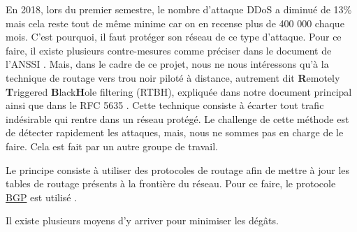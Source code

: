 En 2018, lors du premier semestre, le nombre d'attaque DDoS a diminué de 13\% mais cela reste tout de même minime car on en recense plus de 400 000 chaque mois. C'est pourquoi, il faut protéger son réseau de ce type d'attaque. Pour ce faire, il existe plusieurs contre-mesures comme préciser dans le document de l'ANSSI \cite{Ans15}. Mais, dans le cadre de ce projet, nous ne nous intéressons qu'à la technique de routage vers trou noir piloté à distance, autrement dit \textbf{R}emotely \textbf{T}riggered \textbf{B}lack\textbf{H}ole filtering (RTBH), expliquée dans notre document principal \cite{Sys05} ainsi que dans le RFC 5635 \cite{Rfcrtbh09}. Cette technique consiste à écarter tout trafic indésirable qui rentre dans un réseau protégé. Le challenge de cette méthode est de détecter rapidement les attaques, mais, nous ne sommes pas en charge de le faire. Cela est fait par un autre groupe de travail.

Le principe consiste à utiliser des protocoles de routage afin de mettre à jour les tables de routage présents à la frontière du réseau. Pour ce faire, le protocole \hyperref[sec:BGP]{BGP} est utilisé \cite{Rfcbgp06}.

Il existe plusieurs moyens d'y arriver pour minimiser les dégâts.\newline

